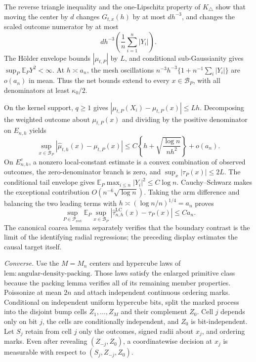 The reverse triangle inequality and the one-Lipschitz property of \(K_\triangle\) show that moving the center by \(d\) changes \(G_{t,x}(h)\) by at most \(dh^{-3}\), and changes the scaled outcome numerator by at most
\[
dh^{-3}\left(\frac1n\sum_{i=1}^n|Y_i|\right).
\]
The H\"older envelope bounds \(|\mu_{t,P}|\) by \(L\), and conditional sub-Gaussianity gives \(\sup_P\mathbb E_PY^2<\infty\).  At \(h\asymp a_n\), the mesh oscillations \(n^{-3}h^{-3}\{1+n^{-1}\sum_i|Y_i|\}\) are \(o(a_n)\) in mean.  Thus the net bounds extend to every \(x\in\mathcal B_P\), with all denominators at least \(\kappa_0/2\).

On the kernel support, \(q\geq1\) gives \(|\mu_{t,P}(X_i)-\mu_{t,P}(x)|\leq Lh\).  Decomposing the weighted outcome about \(\mu_{t,P}(x)\) and dividing by the positive denominator on \(E_{n,h}\) yields
\[
\sup_{x\in\mathcal B_P}|\widehat\mu_{t,h}(x)-\mu_{t,P}(x)|
\leq C\left\{h+\sqrt{\frac{\log n}{nh^2}}\right\}+o(a_n).
\]
On \(E_{n,h}^c\), a nonzero local-constant estimate is a convex combination of observed outcomes, the zero-denominator branch is zero, and \(\sup_x|\tau_P(x)|\leq2L\).  The conditional tail envelope gives \(\mathbb E_P\max_{i\leq n}|Y_i|^2\leq C\log n\).  Cauchy--Schwarz makes the exceptional contribution \(O(n^{-6}\sqrt{\log n})\).  Taking the arm difference and balancing the two leading terms with \(h\asymp(\log n/n)^{1/4}=a_n\) proves
\[
\sup_{P\in\mathcal P_{\mathrm{rect}}}\mathbb E_P\sup_{x\in\mathcal B_P}
|\widehat\tau^{\mathrm{LC}}_{n,h}(x)-\tau_P(x)|\leq Ca_n.
\]
The canonical coarea lemma separately verifies that the boundary contrast is the limit of the identifying radial regressions; the preceding display estimates the causal target itself.

\emph{Converse.}
Use the \(M=M_n\) centers and hypercube laws of \(\mathrm{lem:angular\text{-}density\text{-}packing}\).  Those laws satisfy the enlarged primitive class because the packing lemma verifies all of its remaining member properties.  Poissonize at mean \(2n\) and attach independent continuous ordering marks.  Conditional on independent uniform hypercube bits, split the marked process into the disjoint bump cells \(Z_1,\ldots,Z_M\) and their complement \(Z_0\).  Cell \(j\) depends only on bit \(j\), the cells are conditionally independent, and \(Z_0\) is bit-independent.  Let \(S_j\) retain from cell \(j\) only the outcomes, signed radii about \(x_j\), and ordering marks.  Even after revealing \((Z_{-j},Z_0)\), a coordinatewise decision at \(x_j\) is measurable with respect to \((S_j,Z_{-j},Z_0)\).

